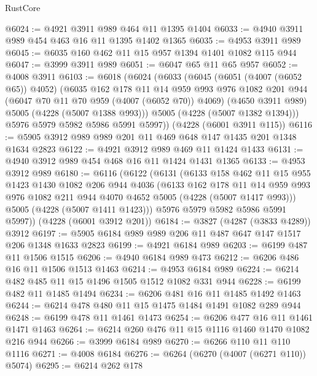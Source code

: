 \begin{lexlean}{RustCore}
\begin{coremodule}
@6024 := @4921 @3911 @989 @464 @11 @1395 @1404
@6033 := @4940 @3911 @989 @454 @463 @16 @11 @1395 @1402 @1365
@6035 := @4953 @3911 @989
@6045 := @6035 @160 @462 @11 @15 @957 @1394 @1401 @1082 @115 @944
@6047 := @3999 @3911 @989
@6051 := @6047 @65 @11 @65 @957
@6052 := @4008 @3911
@6103 := @6018
    (@6024
      (@6033
        (@6045
          (@6051 (@4007 (@6052 @65)) @4052)
          (@6035
            @162
            @178
            @11
            @14
            @959
            @993
            @976
            @1082
            @201
            @944
            (@6047 @70 @11 @70 @959 (@4007 (@6052 @70)) @4069)
            (@4650 @3911 @989)
            @5005
            (@4228 (@5007 @1388 @993)))
          @5005
          (@4228 (@5007 @1382 @1394)))
        @5976
        @5979
        @5982
        @5986
        @5991
        @5997))
    (@4228 (@6001 @3911 @115))
@6116 := @5905 @3912 @989 @989 @201 @11 @469 @648 @147 @1435 @201 @1348 @1634 @2823
@6122 := @4921 @3912 @989 @469 @11 @1424 @1433
@6131 := @4940 @3912 @989 @454 @468 @16 @11 @1424 @1431 @1365
@6133 := @4953 @3912 @989
@6180 := @6116
    (@6122
      (@6131
        (@6133
          @158
          @462
          @11
          @15
          @955
          @1423
          @1430
          @1082
          @206
          @944
          @4036
          (@6133
            @162
            @178
            @11
            @14
            @959
            @993
            @976
            @1082
            @211
            @944
            @4070
            @4652
            @5005
            (@4228 (@5007 @1417 @993)))
          @5005
          (@4228 (@5007 @1411 @1423)))
        @5976
        @5979
        @5982
        @5986
        @5991
        @5997))
    (@4228 (@6001 @3912 @201))
@6184 := @3827 (@4287 (@3833 @4289)) @3912
@6197 := @5905 @6184 @989 @989 @206 @11 @487 @647 @147 @1517 @206 @1348 @1633 @2823
@6199 := @4921 @6184 @989
@6203 := @6199 @487 @11 @1506 @1515
@6206 := @4940 @6184 @989 @473
@6212 := @6206 @486 @16 @11 @1506 @1513 @1463
@6214 := @4953 @6184 @989
@6224 := @6214 @482 @485 @11 @15 @1496 @1505 @1512 @1082 @331 @944
@6228 := @6199 @482 @11 @1485 @1494
@6234 := @6206 @481 @16 @11 @1485 @1492 @1463
@6244 := @6214 @478 @480 @11 @15 @1475 @1484 @1491 @1082 @289 @944
@6248 := @6199 @478 @11 @1461 @1473
@6254 := @6206 @477 @16 @11 @1461 @1471 @1463
@6264 := @6214 @260 @476 @11 @15 @1116 @1460 @1470 @1082 @216 @944
@6266 := @3999 @6184 @989
@6270 := @6266 @110 @11 @110 @1116
@6271 := @4008 @6184
@6276 := @6264 (@6270 (@4007 (@6271 @110)) @5074)
@6295 := @6214
    @262
    @178

\end{coremodule}
\end{lexlean}

